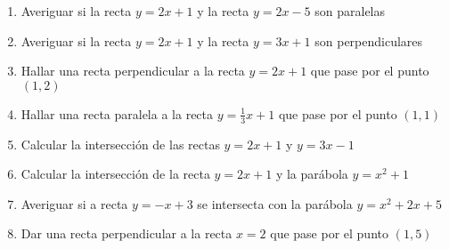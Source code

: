 \documentclass[a4paper]{article}
\begin{document}
\begin{enumerate}
	\begin{enumerate} [label=(\alph*)]
		\item Averiguar si la recta $y=2x+1$ y la recta $y=2x-5$ son paralelas
		\item Averiguar si la recta $y=2x+1$ y la recta $y=3x+1$ son perpendiculares
		\item Hallar una recta perpendicular a la recta $y=2x+1$ que pase por el punto $(1,2)$
		\item Hallar una recta paralela a la recta $y=\frac{1}{3}x+1$ que pase por el punto $(1,1)$
		\item Calcular la intersección de las rectas $y=2x+1$ y $y=3x-1$
		\item Calcular la intersección de la recta $y=2x+1$ y la parábola $y=x^2+1$
		\item Averiguar si a recta $y=-x+3$ se intersecta con la parábola $y=x^2+2x+5$
		\item Dar una recta perpendicular a la recta $x=2$ que pase por el punto $(1,5)$
	\end{enumerate}
\end{enumerate}
\vspace{20pt} 
\end{document}
